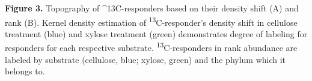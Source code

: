\textbf{Figure 3.}  Topography of ^{13}C-responders based on their density shift (A) and rank (B). Kernel density estimation of \textsuperscript{13}C-responder's density shift in cellulose treatment (blue) and xylose treatment (green) demonstrates degree of labeling for responders for each respective substrate. \textsuperscript{13}C-responders in rank abundance are labeled by substrate (cellulose, blue; xylose, green) and the phylum which it belongs to.  